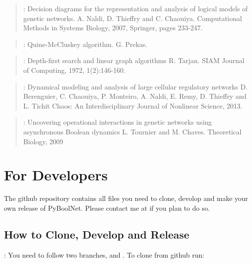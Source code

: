 \documentclass[letterpaper,10pt,english]{sphinxmanual}
\begin{document}
\label{\detokenize{Bibliography:naldi2007}}\begin{quote}

:
Decision diagrams for the representation and analysis of logical models of genetic networks.
A. Naldi, D. Thieffry and C. Chaouiya.
Computational Methods in Systems Biology, 2007, Springer, pages 233-247.
\end{quote}
\label{\detokenize{Bibliography:prekas2012}}\begin{quote}

:
Quine-McCluskey algorithm.
G. Prekas.
\end{quote}
\label{\detokenize{Bibliography:tarjan1972}}\begin{quote}

:
Depth-first search and linear graph algorithms
R. Tarjan.
SIAM Journal of Computing, 1972, 1(2):146-160.
\end{quote}
\label{\detokenize{Bibliography:berenguier2013}}\begin{quote}

:
Dynamical modeling and analysis of large cellular regulatory networks
D. Berenguier, C. Chaouiya, P. Monteiro, A. Naldi, E. Remy, D. Thieffry and L. Tichit
Chaos: An Interdisciplinary Journal of Nonlinear Science, 2013.
\end{quote}
\label{\detokenize{Bibliography:tournier2009}}\begin{quote}

:
Uncovering operational interactions in genetic networks using asynchronous Boolean dynamics
L. Tournier and M. Chaves.
Theoretical Biology, 2009
\end{quote}


\chapter{For Developers}
\label{\detokenize{Development:networkx-has-path}}\label{\detokenize{Development::doc}}\label{\detokenize{Development:for-developers}}
The github repository contains all files you need to clone, devolop and make your own release of PyBoolNet.
Please contact me at  if you plan to do so.


\section{How to Clone, Develop and Release}
\label{\detokenize{Development:how-to-clone-develop-and-release}}
:
You need to follow two branches,  and .
To clone from github run:
\end{document}
